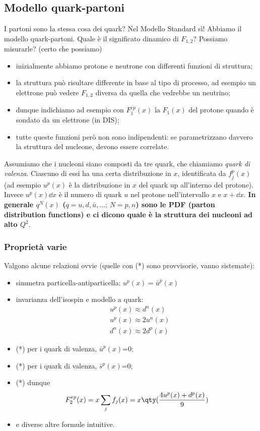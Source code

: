 \subsection{Modello quark-partoni}
I partoni sono la stessa cosa dei quark? Nel Modello Standard sì! Abbiamo il modello quark-partoni. Quale è il significato dinamico di $F_{1,2}$? Possiamo misurarle? (certo che possiamo)
\begin{itemize}
    \item inizialmente abbiamo protone e neutrone con differenti funzioni di struttura;
    \item la struttura può risultare differente in base al tipo di processo, ad esempio un elettrone può vedere $F_{1,2}$ diversa da quella che vedrebbe un neutrino;
    \item dunque indichiamo ad esempio con $F_1^{ep}(x)$ la $F_1(x)$ del protone quando è sondato da un elettrone (in DIS);
    \item tutte queste funzioni però non sono indipendenti: se parametrizzano davvero la struttura del nucleone, devono essere correlate.
\end{itemize}
Assumiamo che i nucleoni siano composti da tre quark, che chiamiamo \textit{quark di valenza}. Ciascuno di essi ha una certa distribuzione in $x$, identificata da $f_j^p(x)$ (ad esempio $u^p(x)$ è la distribuzione in $x$ del quark up all'interno del protone). Invece $u^p(x)\dd x$ è il numero di quark $u$ nel protone nell'intervallo $x$ e $x+\dd x$. \textbf{In generale $q^N(x)$ ($q=u,d,\bar u,\dots;\, N=p,n$) sono le PDF (parton distribution functions) e ci dicono quale è la struttura dei nucleoni ad alto $Q^2$}.
\subsubsection{Proprietà varie}
Valgono alcune relazioni ovvie (quelle con (*) sono provvisorie, vanno sistemate):
\begin{itemize}
    \item simmetra particella-antiparticella: $u^p(x)=\bar u^{\bar p}(x)$
    \item invarianza dell'isospin e modello a quark:
    \begin{align*}
    &u^p(x)\approx d^n(x)\\
    &u^p(x)\approx 2u^n(x)\\
    &d^n(x)\approx 2d^p(x)
    \end{align*}
    \item (*) per i quark di valenza, $\bar u^p(x)$=0;
    \item (*) per i quark di valenza, $\bar s^p(x)$=0;
    \item (*) dunque
    \begin{equation*}
    F_2^{ep}(x)=x\sum_j f_j(x)=x\qty(\frac{4u^p(x)+d^p(x)}{9}   )
    \end{equation*}
    \item e diverse altre formule intuitive.
\end{itemize}
